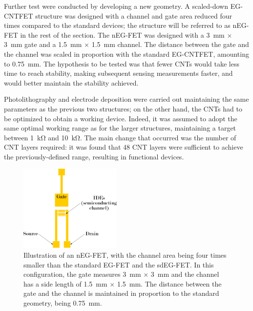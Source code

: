Further test were conducted by developing a new geometry. A scaled-down EG-CNTFET structure was designed with a channel and gate area reduced four times compared to the standard devices; the structure will be referred to as nEG-FET in the rest of the section. The nEG-FET was designed with a \SI{3}{\mm} $\times$ \SI{3}{\mm} gate and a \SI{1.5}{\mm} $\times$ \SI{1.5}{\mm} channel. The distance between the gate and the channel was scaled in proportion with the standard EG-CNTFET, amounting to \SI{0.75}{\mm}. The hypothesis to be tested was that fewer CNTs would take less time to reach stability, making subsequent sensing measurements faster, and would better maintain the stability achieved.

Photolithography and electrode deposition were carried out maintaining the same parameters as the previous two structures; on the other hand, the CNTs had to be optimized to obtain a working device. Indeed, it was assumed to adopt the same optimal working \rds{} range as for the larger structures, maintaining a target between \SI{1}{\kohm} and \SI{10}{\kohm}. The main change that occurred was the number of CNT layers required: it was found that \num{48} CNT layers were sufficient to achieve the previously-defined range, resulting in functional devices.

\begin{figure}
    \centering
    \includegraphics[width = 0.45\textwidth]{figures/chapter3/nEGFET/nEGFET_scheme.pdf}
    \caption{Illustration of an nEG-FET, with the channel area being four times smaller than the standard EG-FET and the sdEG-FET. In this configuration, the gate measures \SI{3}{\mm} $\times$ \SI{3}{\mm} and the channel has a side length of \SI{1.5}{\mm} $\times$ \SI{1.5}{\mm}. The distance between the gate and the channel is maintained in proportion to the standard geometry, being \SI{0.75}{\mm}.}
    \label{fig:nEGFET}
\end{figure}

